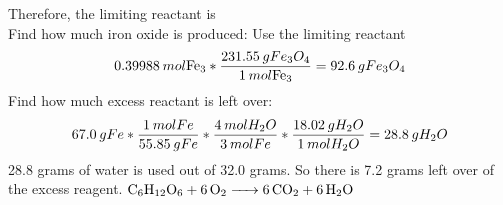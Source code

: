 \documentclass[../main.tex]{subfiles}
\begin{document}
Therefore, the limiting reactant is  \\
Find how much iron oxide is produced: Use the limiting reactant
\begin{equation}
    0.39988\hspace{0.2em}mol \ce{Fe_{3}} * \frac{231.55\hspace{0.2em}gFe_{3}O_{4}}{1\hspace{0.2em} mol\ce{Fe_{3}}} = 92.6 \hspace{0.2em}g Fe_{3}O_{4}
\end{equation}
Find how much excess reactant is left over:
\begin{equation}
    67.0\hspace{0.2em}gFe * \frac{1\hspace{0.2em}molFe}{55.85\hspace{0.2em}gFe} * \frac{4\hspace{0.2em}mol H_{2}O}{3\hspace{0.2em}molFe} * \frac{18.02\hspace{0.2em}gH_{2}O}{1\hspace{0.2em}molH_{2}O} = 28.8\hspace{0.2em}g H_{2}O
\end{equation}
28.8 grams of water is used out of 32.0 grams. So there is 7.2 grams left over of the excess reagent. 
\AnswerSet
{}
\AnswerSet
{}
\AnswerSet
\(\ce{C6H_{12}O6 + 6O2 -> 6CO2 + 6H2O}\)
\AnswerSet
{}
\end{document}
